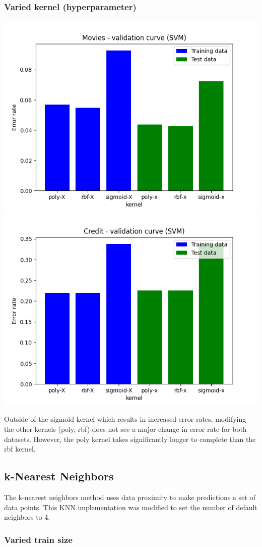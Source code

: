 \documentclass{article}
\begin{document}
\subsubsection{Varied kernel (hyperparameter)}

\begin{center}
    \includegraphics[width=.45\linewidth]{movies-svc-validation_curve.png}
    \includegraphics[width=.45\linewidth]{credit-svc-validation_curve.png}
\end{center}

Outside of the sigmoid kernel which results in increased error rates, modifying the other kernels (poly, rbf) does not see a major change in error rate for both datasets. However, the poly kernel takes significantly longer to complete than the rbf kernel.

\subsection{k-Nearest Neighbors}

The k-nearest neighbors method uses data proximity to make predictions a set of data points. This KNN implementation was modified to set the number of default neighbors to 4.

\subsubsection{Varied train size}
\end{document}
